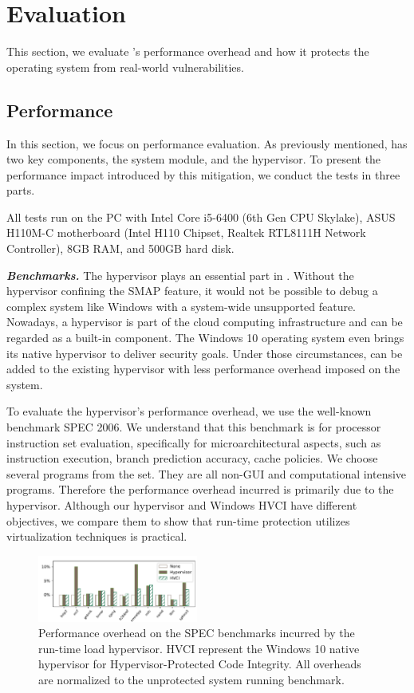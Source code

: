
\section{Evaluation}
\label{sec:ktoctou-evaluation}

This section, we evaluate \name's performance overhead and how it protects the operating system from real-world vulnerabilities.


\subsection{Performance}
In this section, we focus on performance evaluation.
As previously mentioned, \name has two key components, the system module, and the hypervisor. To present the performance impact introduced by this mitigation, we conduct the tests in three parts. 

All tests run on the PC with Intel Core i5-6400 (6th Gen CPU Skylake), ASUS H110M-C motherboard (Intel H110 Chipset, Realtek RTL8111H Network Controller), 8GB RAM, and 500GB hard disk.

\textbf{\textit{Benchmarks.}} The hypervisor plays an essential part in \name. Without the hypervisor confining the SMAP feature, it would not be possible to debug a complex system like Windows with a system-wide unsupported feature. Nowadays, a hypervisor is part of the cloud computing infrastructure and can be regarded as a built-in component. The Windows 10 operating system even brings its native hypervisor to deliver security goals. Under those circumstances, \name can be added to the existing hypervisor with less performance overhead imposed on the system. 


To evaluate the hypervisor's performance overhead, we use the well-known benchmark SPEC 2006. We understand that this benchmark is for processor instruction set evaluation, specifically for microarchitectural aspects, such as instruction execution, branch prediction accuracy, cache policies. We choose several programs from the set. They are all non-GUI and computational intensive programs. Therefore the performance overhead incurred is primarily due to the hypervisor. Although our hypervisor and Windows HVCI have different objectives, we compare them to show that run-time protection utilizes virtualization techniques is practical.

\begin{figure}[th]
  \includegraphics[width=0.47\textwidth]{figures/benchmark3}
  \centering
  \caption{Performance overhead on the SPEC benchmarks incurred by the run-time load hypervisor. HVCI represent the Windows 10 native hypervisor for Hypervisor-Protected Code Integrity. All overheads are normalized to the unprotected system running benchmark.}
  \label{fig:ktoctou-benchmark}
\end{figure}


